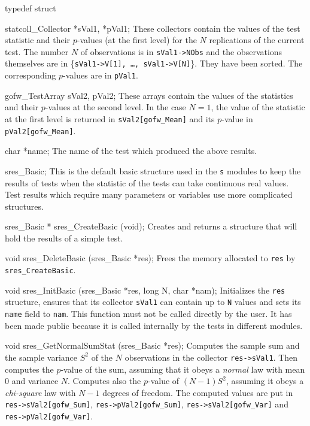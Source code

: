 typedef struct {

   statcoll_Collector *sVal1, *pVal1;
\endcode
 \tabb
  These collectors contain the values of the test statistic and their
  $p$-values  (at the first level) for the $N$ replications of the current
  test. The number $N$ of observations is in {\tt sVal1->NObs} and the
  observations themselves are in \{{\tt sVal1->V[1], \ldots,
  sVal1->V[N]}\}. They have been sorted.
  The corresponding $p$-values are in {\tt pVal1}.
 \endtabb
\code

   gofw_TestArray sVal2, pVal2;
\endcode
 \tabb
  These arrays contain the values of the statistics and their $p$-values
  at the second level. In the case $N=1$, the value of the  statistic at
  the first level is returned in {\tt sVal2[gofw\_Mean]} and its $p$-value
  in {\tt pVal2[gofw\_Mean]}.
 \endtabb
\code

   char *name;
\endcode
 \tabb
  The name of the test which produced the above results.
 \endtabb
\code

} sres_Basic;
\endcode
 \tab
  This is the default basic structure used in the {\tt s} modules
  to keep the results of tests when the statistic of the tests can take
  continuous real values. Test results which require many parameters or
  variables use more complicated structures.
 \endtab
\code


sres_Basic * sres_CreateBasic (void);
\endcode
 \tab 
  Creates and returns a structure that will hold the results
  of a simple test. 
 \endtab
\code


void sres_DeleteBasic (sres_Basic *res);
\endcode
 \tab 
  Frees the memory allocated to {\tt res} by {\tt sres\_CreateBasic}.
 \endtab
\code


void sres_InitBasic (sres_Basic *res, long N, char *nam);
\endcode
 \tab 
   Initializes the {\tt res} structure, ensures that its
   collector {\tt sVal1}  can contain up to  {\tt N} values and sets
   its  {\tt name} field to  {\tt nam}. This function must not be called
   directly by the user. It has been made public because it is called
   internally by the tests in different modules.
 \endtab
\code


void sres_GetNormalSumStat (sres_Basic *res);
\endcode
 \tab
  Computes the sample sum and the sample variance $S^2$ of the $N$ observations in 
  the collector {\tt res->sVal1}. Then computes the $p$-value of the sum, assuming
  that it obeys a {\em normal\/} law with mean 0 and variance $N$. Computes also
  the $p$-value of $(N-1)S^2$, assuming it obeys a {\em chi-square\/} law with 
  $N-1$ degrees of freedom. The computed values are put in
  {\tt res->sVal2[gofw\_Sum]}, {\tt res->pVal2[gofw\_Sum]},
  {\tt res->sVal2[gofw\_Var]} and {\tt res->pVal2[gofw\_Var]}.
 \endtab



